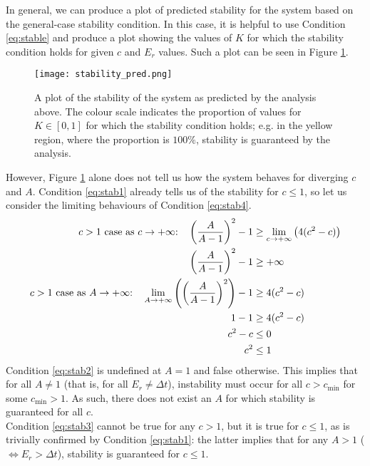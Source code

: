 \documentclass[11pt]{article}
\begin{document}
In general, we can produce a plot of predicted stability for the system based on the general-case stability condition. In this case, it is helpful to use Condition \ref{eq:stable} and produce a plot showing the values of $K$ for which the stability condition holds for given $c$ and $E_r$ values. Such a plot can be seen in Figure \ref{fig:stability_pred}.
\begin{figure}[H]
\centering
\texttt{[image: stability\_pred.png]}
\caption{A plot of the stability of the system as predicted by the analysis above. The colour scale indicates the proportion of values for $K\in[0,1]$ for which the stability condition holds; e.g. in the yellow region, where the proportion is $100\%$, stability is guaranteed by the analysis.}
\label{fig:stability_pred}
\end{figure}
However, Figure \ref{fig:stability_pred} alone does not tell us how the system behaves for diverging $c$ and $A$. Condition \ref{eq:stab1} already tells us of the stability for $c\leq 1$, so let us consider the limiting behaviours of Condition \ref{eq:stab4}.
\begin{align}
\text{$c>1$ case as $c\to +\infty$:\quad} \left(\frac{A}{A-1}\right)^2 -1 &\geq \lim_{c\to +\infty}\left(4(c^2-c)\right) \nonumber \\
\left(\frac{A}{A-1}\right)^2 -1 &\geq +\infty		\label{eq:stab2} \\
\text{$c>1$ case as $A\to +\infty$:\quad} \lim_{A\to +\infty}\left(\left(\frac{A}{A-1}\right)^2\right)-1 &\geq 4(c^2-c) \nonumber\\
1 - 1 &\geq 4(c^2-c) \nonumber\\
c^2-c &\leq 0 \nonumber\\
c^2 &\leq 1		\label{eq:stab3}
\end{align}
Condition \ref{eq:stab2} is undefined at $A=1$ and false otherwise. This implies that for all $A\neq 1$ (that is, for all $E_r\neq\Delta t$), instability must occur for all $c>c_{\text{min}}$ for some $c_{\text{min}}>1$. As such, there does not exist an $A$ for which stability is guaranteed for all $c$. \\
Condition \ref{eq:stab3} cannot be true for any $c>1$, but it is true for $c\leq 1$, as is trivially confirmed by Condition \ref{eq:stab1}: the latter implies that for any $A>1$ ($\Leftrightarrow E_r>\Delta t$), stability is guaranteed for $c\leq 1$.
\end{document}
